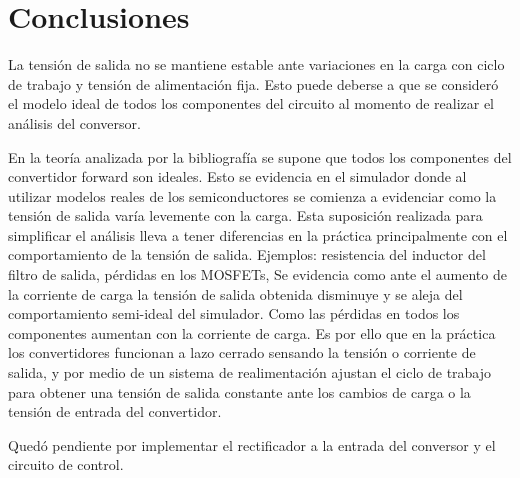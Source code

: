 \section{Conclusiones}


La tensión de salida no se mantiene estable ante variaciones en la carga con ciclo de trabajo y tensión de alimentación fija. 
Esto puede deberse a que se consideró el modelo ideal de todos los componentes del circuito al momento de realizar el análisis del conversor. 

En la teoría analizada por la bibliografía se supone que todos los componentes del convertidor forward son ideales. 
Esto se evidencia en el simulador donde al utilizar modelos reales de los semiconductores se comienza a evidenciar como la tensión de salida varía levemente con la carga. 
Esta suposición realizada para simplificar el análisis lleva a tener diferencias en la práctica principalmente con el comportamiento de la tensión de salida. 
Ejemplos: resistencia del inductor del filtro de salida, pérdidas en los MOSFETs,
Se evidencia como ante el aumento de la corriente de carga la tensión de salida obtenida disminuye y se aleja del comportamiento semi-ideal del simulador. 
Como las pérdidas en todos los componentes aumentan con la corriente de carga. 
Es por ello que en la práctica los convertidores funcionan a lazo cerrado sensando la tensión o corriente de salida, y por medio de un sistema de realimentación ajustan el ciclo de trabajo para obtener una tensión de salida constante ante los cambios de carga o la tensión de entrada del convertidor.


Quedó pendiente por implementar el rectificador a la entrada del conversor y el circuito de control.